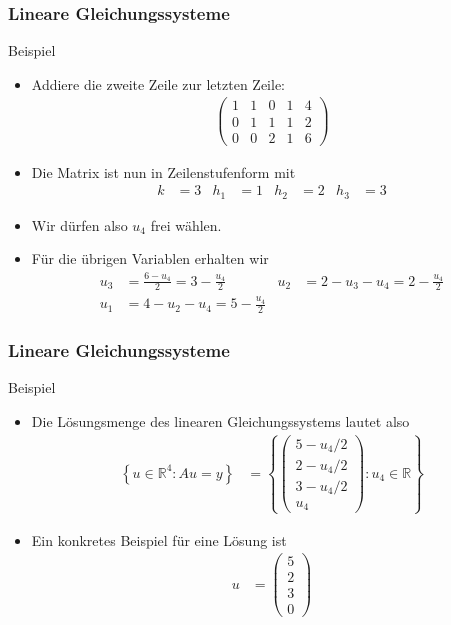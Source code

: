 \documentclass{beamer}
\newcommand\RR{\mathbb R}
\newcommand\bc[1]{\left({#1}\right)}
\newcommand\cbc[1]{\left\{{#1}\right\}}
\renewcommand{\ae}{\"a}
\renewcommand{\oe}{\"o}
\newcommand{\ue}{\"u}
\newcommand{\mytitle}{Lineare Gleichungssysteme}
\begin{document}
\begin{frame}\frametitle{\mytitle}
	\begin{block}{Beispiel}
		\begin{itemize}
			\item Addiere die zweite Zeile zur letzten Zeile:
				\begin{align*}
					\bc{\begin{array}{cccc|c}1&1&0&1&4\\0&1&1&1&2\\0&0&2&1&6\end{array}}
				\end{align*}
			\item Die Matrix ist nun in Zeilenstufenform mit
				\begin{align*}
					k&=3&h_1&=1&h_2&=2&h_3&=3
				\end{align*}
			\item Wir d\ue rfen also $u_4$ frei w\ae hlen.
			\item F\ue r die \ue brigen Variablen erhalten wir
				\begin{align*}
					u_3&=\frac{6-u_4}{2}=3-\frac{u_4}{2}&
					u_2&=2-u_3-u_4=2-\frac{u_4}2\\
					u_1&=4-u_2-u_4=5-\frac{u_4}{2}
				\end{align*}
		\end{itemize}
	\end{block}
\end{frame}

\begin{frame}\frametitle{\mytitle}
	\begin{block}{Beispiel}
		\begin{itemize}
			\item Die L\oe sungsmenge des linearen Gleichungssystems lautet also
				\begin{align*}
					\cbc{u\in\RR^4:Au=y}&=\cbc{\begin{pmatrix}
					5-u_4/2\\2-u_4/2\\3-u_4/2\\u_4
			\end{pmatrix}:u_4\in\RR}
				\end{align*}
			\item Ein konkretes Beispiel f\ue r eine L\oe sung ist
				\begin{align*}
					u&=\begin{pmatrix} 5\\2\\3\\0 \end{pmatrix}
				\end{align*}
		\end{itemize}
	\end{block}
\end{frame}
\end{document}
